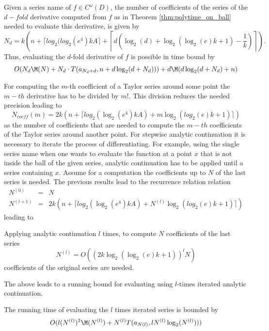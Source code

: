 		\begin{theorem}
			Given a series name of $f \in C^\omega(D)$, the number of coefficients of the series of the $d-fold$ derivative computed from $f$ as in Theorem \ref{thm:polytime_on_ball} needed to evaluate this derivative, is given by 
			$$N_d = k\left(n+\lceil log_2(log_2 (e^4) kA \rceil+\left \lceil d\left(\log_2(d)+\log_2(\log_2(e)k+1)-\frac{1}{k}\right)\right\rceil\right).$$
			Thus, evaluating the $d$-fold derivative of $f$ is possible in time bound by
			$$ O(N_d\M(N)+N_d \cdot T(a_{N_d+d}, n+d\log_2(d+N_d)))+d\M(d \log_2 (d+N_d)+n) $$ 
		\end{theorem}
		For computing the $m$-th coefficient of a Taylor series around some point the $m-th$ derivative 
		has to be divided by $m!$. This division reduces the needed precision leading to 
		$$N_{coeff}(m) = 2k\left( n+\lceil log_2(\log_2 (e^4) kA) + m \log_2(log_2(e)k+1)\rceil \right)$$
		as the number of coefficients that are needed to compute the $m-th$ coefficients of the Taylor series 
		around another point. 
		For stepwise analytic continuation it is necessary to iterate the process of differentiating.
		For example, using the single series name when one wants to evaluate the function at a point $x$
		that is not inside the ball of the given series, analytic continuation has to be applied until a series
		containing $x$.
		Assume for a computation the coefficients up to $N$ of the last series is needed. 
		The previous results lead to the recurrence relation
		relation 
		\begin{eqnarray*}
			N^{(0)} &=& N \\
			N^{(l+1)} &=& 2k\left( n+\lceil log_2(\log_2 (e^4) kA) + N^{(l)} \log_2(log_2(e)k+1)\rceil \right)
		\end{eqnarray*}
		leading to
		\begin{theorem}
			Applying analytic continuation $l$ times, to compute $N$ coefficients of the last series 
			\begin{equation}
				N^{(l)} = O((2k \log_2 (\log_2 (e)k +1))^lN) 
			\end{equation}
			coefficients of the original series are needed.
		\end{theorem}
		The above leads to a running bound for evaluating using $l$-times iterated analytic continuation.
		\begin{theorem}
			The running time of evaluating the $l$ times iterated series is bounded by
			\begin{equation}
				 O(l(N^{(l)})^2\M(N^{(l)})+N^{(l)}T(a_{N(l)}, l N^{(l)}\log_2(N^{(l)}))) 
			\end{equation}
		\end{theorem}
